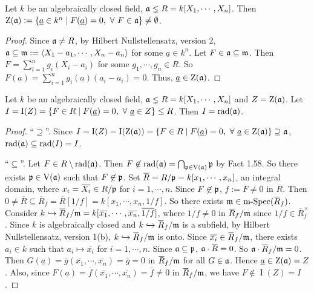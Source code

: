 \begin{theorem}
    Let $k$ be an algebraically closed field, $\mathfrak{a} \lneq R = k[X_1,\cdots,X_n]$. Then $\operatorname{Z}(\mathfrak{a}) := \{\underline a \in k^{n} \mid F(\underline a) = 0, \ \forall \  F \in \mathfrak{a}\} \neq \emptyset$.
\end{theorem}

\begin{proof}
    Since $\mathfrak{a} \neq R$, by Hilbert Nullstellensatz, version 2, $\mathfrak{a} \subseteq \mathfrak{m} := \langle X_1-a_1,\cdots,X_n-a_n \rangle$ for some $\underline a \in k^{n}$. Let $F \in \mathfrak{a} \subseteq \mathfrak{m}$. Then $F = \sum_{i=1}^{n} g_i(X_i-a_i)$ for some $g_1,\cdots,g_n \in R$. So $F(\underline a) = \sum_{i=1}^{n} g_i(\underline a)(a_i - a_i) = 0$. Thus, $\underline a \in \operatorname{Z}(\mathfrak{a})$.
\end{proof}

\begin{theorem}
    Let $k$ be an algebraically closed field, $\mathfrak{a} \lneq R = k[X_1,\cdots,X_n]$ and $Z = \operatorname{Z}(\mathfrak{a})$. Let $I = \operatorname{I}(Z) = \{F \in R \mid F(\underline a) = 0, \ \forall \  \underline a \in Z\} \leq R$. Then $I = \operatorname{rad}(\mathfrak{a})$.
\end{theorem}

\begin{proof}
    ``$\supseteq$''.  Since $I = \operatorname{I}(Z) = \operatorname{I}(\operatorname{Z}(\mathfrak{a})) = \{F \in R \mid F(\underline a) = 0, \ \forall \  \underline a \in \operatorname{Z}(\mathfrak{a})\} \supseteq \mathfrak{a}$, $\operatorname{rad}(\mathfrak{a}) \subseteq \operatorname{rad}(I) = I$. \par 
    ``$\subseteq$''. Let $F \in R \setminus \operatorname{rad}(\mathfrak{a})$. Then $F \not \in \operatorname{rad}(\mathfrak{a}) = \bigcap_{\mathfrak{p} \in \operatorname{V}(\mathfrak{a})} \mathfrak{p}$ by Fact 1.58. So there exists $\mathfrak{p} \in \operatorname{V}(\mathfrak{a})$ such that $F \not\in \mathfrak{p}$. Set $\overbar{R} = R/\ffp = k[x_1,\cdots,x_n]$, an integral domain, where $x_i = \overbar{X_i} \in R/\ffp$ for $i = 1,\cdots,n$. Since $F \not\in \mathfrak{p}$, $f := \overbar{F} \neq 0$ in $\overbar{R}$. Then $0 \neq \overbar{R} \subseteq \overbar{R}_f = \overbar{R}[1/f] = k[x_1,\cdots,x_n,1/f]$. So there exists $\ffm \in \operatorname{m-Spec}(\overbar{R}_f)$. Consider $k \hookrightarrow \overbar{R}_f/\ffm = k[\overbar{x_1},\cdots,\overbar{x_n},\overbar{1/f}]$, where $\overbar{1/f} \neq 0$ in $\overbar{R}_f/\ffm$ since $1/f \in \overbar{R}_f^{\times}$. Since $k$ is algebraically closed and $k \hookrightarrow \overbar{R}_f/\ffm$ is a subfield, by Hilbert Nullstellensatz, version 1(b), $k \hookrightarrow \overbar{R}_f/\ffm$ is onto. Since $\overbar{x_i} \in \overbar{R}_f/\ffm$, there exists $a_i \in k$ such that $a_i \mapsto \overbar{x_i}$ for $i = 1,\cdots,n$. Since $\mathfrak{a} \subseteq \mathfrak{p}$, $\ffa \cdot \overbar{R} = 0$. So $\ffa \cdot \overbar{R}_f/\ffm = 0$. Then $G(\underline a) = \overbar{g}(\overbar{x_1},\cdots,\overbar{x_n}) = \overbar{g} = 0$ in $\overbar{R}_f/\ffm$ for all $G \in \mathfrak{a}$. Hence $\underline a \in \operatorname{Z}(\mathfrak{a}) = Z$. Also, since $F(\underline a) = \overbar{f}(\overbar{x_1},\cdots,\overbar{x_n}) = \overbar{f} \neq 0$ in $\overbar{R}_f/\ffm$, we have $F \not\in \operatorname{I}(Z) = I$.
\end{proof}
